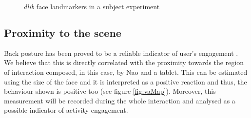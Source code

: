 \begin{figure}[!htb]
        \centering
        \caption{\textit{dlib} face landmarkers in a subject experiment}
        \label{fig:dlib}
\end{figure}


\subsection{Proximity to the scene}
Back posture has been proved to be a reliable indicator of user's engagement \cite{d2007posture} \cite{castellano2009detecting}. We believe that this is directly correlated with the proximity towards the region of interaction composed, in this case, by Nao and a tablet. This can be estimated using the size of the face and it is interpreted as a positive reaction and thus, the behaviour shown is positive too (see figure \ref{fig:vaMap}). Moreover, this measurement will be recorded during the whole interaction and analysed as a possible indicator of activity engagement.

